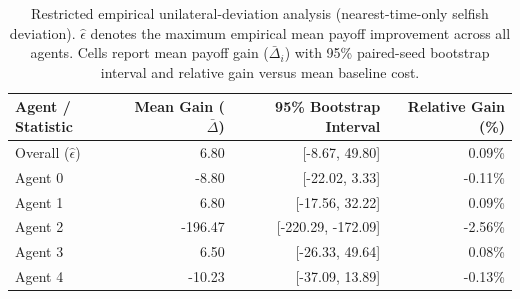 \begin{table}[t]
\centering\scriptsize
\setlength{\tabcolsep}{3.5pt}
\renewcommand{\arraystretch}{0.88}
\caption{Restricted empirical unilateral-deviation analysis (nearest-time-only selfish deviation). $\widehat{\epsilon}$ denotes the maximum empirical mean payoff improvement across all agents. Cells report mean payoff gain ($\bar{\Delta}_i$) with 95\% paired-seed bootstrap interval and relative gain versus mean baseline cost.}
\label{tab:deviation}
\begin{tabular}{lrrr}
\toprule
Agent / Statistic & Mean Gain ($\bar{\Delta}$) & 95\% Bootstrap Interval & Relative Gain (\%) \\
\midrule
Overall ($\widehat{\epsilon}$) & 6.80 & [-8.67, 49.80] & 0.09\% \\
\midrule
Agent 0 & -8.80 & [-22.02, 3.33] & -0.11\% \\
Agent 1 & 6.80 & [-17.56, 32.22] & 0.09\% \\
Agent 2 & -196.47 & [-220.29, -172.09] & -2.56\% \\
Agent 3 & 6.50 & [-26.33, 49.64] & 0.08\% \\
Agent 4 & -10.23 & [-37.09, 13.89] & -0.13\% \\
\bottomrule
\end{tabular}
\end{table}
